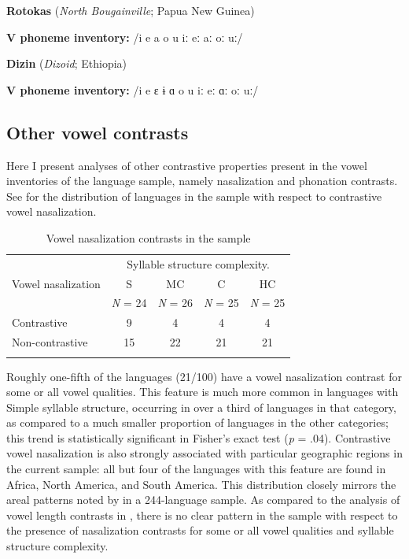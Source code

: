 \ea\label{ex:4.13}
  \textbf{Rotokas} (\textit{North Bougainville}; Papua New Guinea)

\textbf{V phoneme inventory:} /i e a o u iː eː aː oː uː/
\z

\ea\label{ex:4.14}
  \textbf{Dizin} (\textit{Dizoid}; Ethiopia)

\textbf{V phoneme inventory:} /i e ɛ ɨ ɑ o u iː eː ɑː oː uː/
\z

\subsection{Other vowel contrasts}\label{sec:4.3.3}

  Here I present analyses of other contrastive properties present in the vowel inventories of the language sample, namely nasalization and phonation contrasts. See  for the distribution of languages in the sample with respect to contrastive vowel nasalization.

\begin{table}
\begin{tabular}{lcccc}
\lsptoprule
 & \multicolumn{4}{c}{Syllable structure complexity.}\\\cmidrule(lr){2-5}
Vowel nasalization & S & MC & C & HC\\
             & \textit{N} = 24 & \textit{N} = 26 & \textit{N} = 25 & \textit{N} = 25\\\midrule
{Contrastive} & 9 & 4 & 4 & 4\\
{Non-contrastive} & 15 & 22 & 21 & 21\\
\lspbottomrule
\end{tabular}
\caption{\label{tab:4.4}Vowel nasalization contrasts in the sample}
\end{table}

  Roughly one-fifth of the languages (21/100) have a vowel nasalization contrast for some or all vowel qualities. This feature is much more common in languages with Simple syllable structure, occurring in over a third of languages in that category, as compared to a much smaller proportion of languages in the other categories; this trend is statistically significant in Fisher’s exact test (\textit{p} = .04). Contrastive vowel nasalization is also strongly associated with particular geographic regions in the current sample: all but four of the languages with this feature are found in Africa, North America, and South America. This distribution closely mirrors the areal patterns noted by \citet{Hajek2013} in a 244-language sample. As compared to the analysis of vowel length contrasts in , there is no clear pattern in the sample with respect to the presence of nasalization contrasts for some or all vowel qualities and syllable structure complexity.

